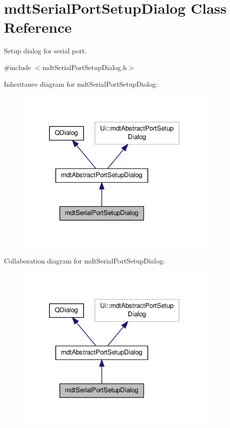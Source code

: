 \hypertarget{classmdt_serial_port_setup_dialog}{\section{mdt\-Serial\-Port\-Setup\-Dialog Class Reference}
\label{classmdt_serial_port_setup_dialog}
}


Setup dialog for serial port.  




{\ttfamily \#include $<$mdt\-Serial\-Port\-Setup\-Dialog.\-h$>$}



Inheritance diagram for mdt\-Serial\-Port\-Setup\-Dialog\-:\nopagebreak
\begin{figure}[H]
\begin{center}
\leavevmode
\includegraphics[width=278pt]{classmdt_serial_port_setup_dialog__inherit__graph}
\end{center}
\end{figure}


Collaboration diagram for mdt\-Serial\-Port\-Setup\-Dialog\-:\nopagebreak
\begin{figure}[H]
\begin{center}
\leavevmode
\includegraphics[width=278pt]{classmdt_serial_port_setup_dialog__coll__graph}
\end{center}
\end{figure}
